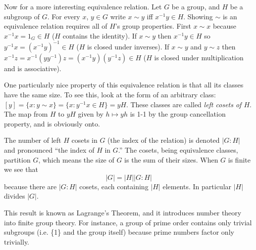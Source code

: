\documentclass[letter]{article}
\begin{document}
Now for a more interesting equivalence relation. Let $G$ be a group, and $H$ be a subgroup of $G$. For every $x$, $y \in G$ write $x \sim y$ iff $x^{-1}y \in H$. Showing $\sim$ is an equivalence relation requires all of $H$'s group properties. First $x \sim x$ because $x^{-1}x = 1_G \in H$ ($H$ contains the identity). If $x \sim y$ then $x^{-1}y \in H$ so $y^{-1}x = (x^{-1}y)^{-1} \in H$ ($H$ is closed under inverses). If $x \sim y$ and $y \sim z$ then $x^{-1}z = x^{-1}(yy^{-1})z = (x^{-1}y)(y^{-1}z) \in H$ ($H$ is closed under multiplication and is associative).

One particularly nice property of this equivalence relation is that all its classes have the same size. To see this, look at the form of an arbitrary class: $\left[y\right] = \{x: y \sim x\} = \{x: y^{-1}x \in H\} = yH$. These classes are called \emph{left cosets of $H$}. The map from $H$ to $yH$ given by $h \mapsto yh$ is 1-1 by the group cancellation property, and is obviously onto.

The number of left $H$ cosets in $G$ (the index of the relation) is denoted $|G : H|$ and pronounced ``the index of $H$ in $G$.'' The cosets, being equivalence classes, partition $G$, which means the size of $G$ is the sum of their sizes.  When $G$ is finite we see that \[|G| = |H||G : H|\] because there are $|G : H|$ cosets, each containing $|H|$ elements. In particular $|H|$ divides $|G|$.

This result is known as Lagrange's Theorem, and it introduces number theory into finite group theory. For instance, a group of prime order contains only trivial subgroups (i.e. \{1\} and the group itself) because prime numbers factor only trivially.
\end{document}
